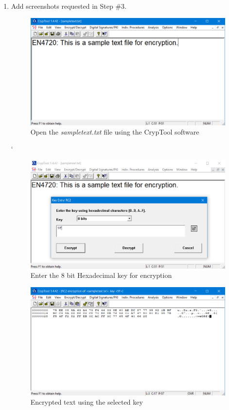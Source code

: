 \documentclass[11pt,letterpaper]{article}
\newenvironment{answer}{\em \color{blue} \begin{adjustwidth}{1cm}{1cm}}{\end{adjustwidth}}
\begin{document}
	\begin{enumerate}
		\item Add screenshots requested in Step \#3.
		\begin{answer}
			\begin{figure}[H]
				\centering
				\includegraphics[width=0.6\columnwidth]{images/p2_q1_1}
				\caption{Open the \textit{sampletext.txt} file using the CrypTool software} \label{fig:enc-step-1}
			\end{figure}
		
			`\begin{figure}[H]
				\centering
				\includegraphics[width=0.6\columnwidth]{images/p2_q1_2}
				\caption{Enter the 8 bit Hexadecimal key for encryption} \label{fig:enc-step-2}
			\end{figure}
		
			\begin{figure}[H]
				\centering
				\includegraphics[width=0.6\columnwidth]{images/p2_q1_3}
				\caption{Encrypted text using the selected key} \label{fig:enc-step-3}
			\end{figure}
		\end{answer}
		

\end{enumerate}
\end{document}
